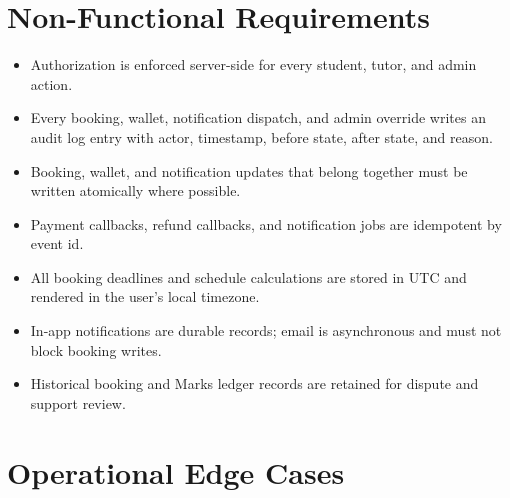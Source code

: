 \documentclass[11pt,a4paper]{article}
\begin{document}
\section{Non-Functional Requirements}

\begin{itemize}
	\item Authorization is enforced server-side for every student, tutor, and admin action.
	\item Every booking, wallet, notification dispatch, and admin override writes an audit log entry with actor, timestamp, before state, after state, and reason.
	\item Booking, wallet, and notification updates that belong together must be written atomically where possible.
	\item Payment callbacks, refund callbacks, and notification jobs are idempotent by event id.
	\item All booking deadlines and schedule calculations are stored in UTC and rendered in the user's local timezone.
	\item In-app notifications are durable records; email is asynchronous and must not block booking writes.
	\item Historical booking and Marks ledger records are retained for dispute and support review.
\end{itemize}

\section{Operational Edge Cases}
\end{document}
